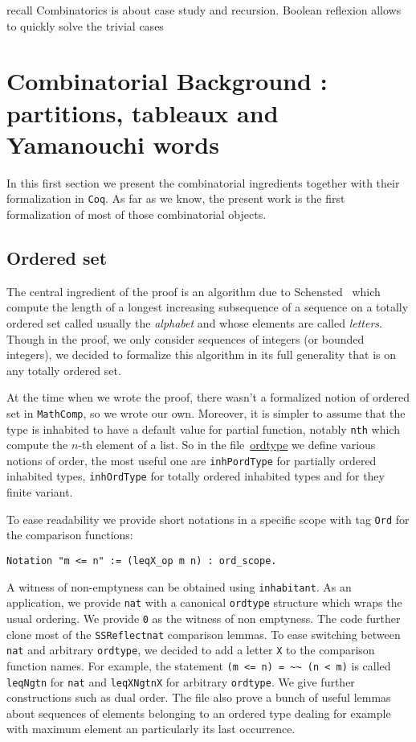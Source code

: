 \documentclass[12pt]{article}
\let\verb=\lstinline
\newcommand{\Coq}{\texttt{Coq}\xspace}
\newcommand{\SSR}{\texttt{SSReflect}\xspace}
\newcommand{\MC}{\texttt{MathComp}\xspace}
\begin{document}
recall 
Combinatorics is about case study and recursion.
Boolean reflexion allows to quickly solve the trivial cases

\section{Combinatorial Background : partitions, tableaux and Yamanouchi words}

In this first section we present the combinatorial ingredients together with
their formalization in \Coq. As far as we know, the present work is the first
formalization of most of those combinatorial objects.


\subsection{Ordered set}

The central ingredient of the proof is an algorithm due to
Schensted~\cite{Schensted61} which compute the length of a longest increasing
subsequence of a sequence on a totally ordered set called usually the
\emph{alphabet} and whose elements are called \emph{letters}. Though in the
proof, we only consider sequences of integers (or bounded integers), we decided
to formalize this algorithm in its full generality that is on any totally
ordered set.

At the time when we wrote the proof, there wasn't a formalized notion of
ordered set in \MC, so we wrote our own. Moreover, it is simpler to assume
that the type is inhabited to have a default value for partial
function, notably \verb|nth| which compute the $n$-th element of a list. So in
the file~\href{http://hivert.github.io/Coq-Combi/Combi.Basic.ordtype.html}{ordtype}
we define various notions of order, the most useful one are
\verb|inhPordType| for partially ordered inhabited types,
\verb|inhOrdType| for totally ordered inhabited types and for they finite
variant.

To ease readability we provide short notations in a specific scope with tag
\verb|Ord| for the comparison functions:
\begin{lstlisting}
Notation "m <= n" := (leqX_op m n) : ord_scope.
\end{lstlisting}
A witness of non-emptyness can be obtained using \verb+inhabitant+.
As an application, we provide \verb|nat| with a canonical \verb|ordtype|
structure which wraps the usual ordering. We provide \verb|0| as the witness
of non emptyness. The code further clone most of the \SSR \verb|nat| comparison
lemmas. To ease switching between \verb|nat| and arbitrary \verb|ordtype|, we
decided to add a letter \verb|X| to the comparison function names. For
example, the statement \verb|(m <= n) = ~~ (n < m)| is called \verb|leqNgtn|
for \verb|nat| and \verb|leqXNgtnX| for arbitrary \verb|ordtype|. We give
further constructions such as dual order. The file also prove a bunch of
useful lemmas about sequences of elements belonging to an ordered type dealing
for example with maximum element an particularly its last occurrence.
\end{document}
